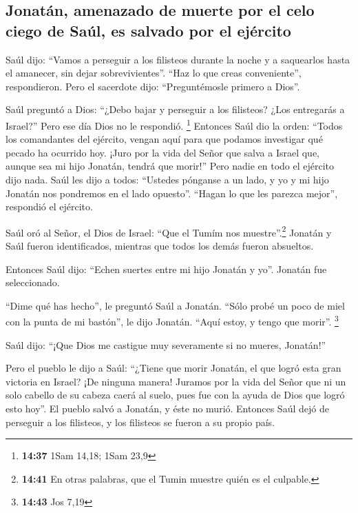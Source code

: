 \hypertarget{jonatuxe1n-amenazado-de-muerte-por-el-celo-ciego-de-sauxfal-es-salvado-por-el-ejuxe9rcito}{%
\subsection{Jonatán, amenazado de muerte por el celo ciego de Saúl, es
salvado por el
ejército}\label{jonatuxe1n-amenazado-de-muerte-por-el-celo-ciego-de-sauxfal-es-salvado-por-el-ejuxe9rcito}}

 Saúl dijo: ``Vamos a perseguir a los filisteos durante
la noche y a saquearlos hasta el amanecer, sin dejar sobrevivientes''.
``Haz lo que creas conveniente'', respondieron. Pero el sacerdote dijo:
``Preguntémosle primero a Dios''.

 Saúl preguntó a Dios: ``¿Debo bajar y perseguir a los
filisteos? ¿Los entregarás a Israel?'' Pero ese día Dios no le
respondió. \footnote{\textbf{14:37} 1Sam 14,18; 1Sam 23,9}
 Entonces Saúl dio la orden: ``Todos los comandantes del
ejército, vengan aquí para que podamos investigar qué pecado ha ocurrido
hoy.  ¡Juro por la vida del Señor que salva a Israel que,
aunque sea mi hijo Jonatán, tendrá que morir!'' Pero nadie en todo el
ejército dijo nada.  Saúl les dijo a todos: ``Ustedes
pónganse a un lado, y yo y mi hijo Jonatán nos pondremos en el lado
opuesto''. ``Hagan lo que les parezca mejor'', respondió el ejército.

 Saúl oró al Señor, el Dios de Israel: ``Que el Tumím nos
muestre''.\footnote{\textbf{14:41} En otras palabras, que el Tumin
  muestre quién es el culpable.} Jonatán y Saúl fueron identificados,
mientras que todos los demás fueron absueltos.

 Entonces Saúl dijo: ``Echen suertes entre mi hijo
Jonatán y yo''. Jonatán fue seleccionado.

 ``Dime qué has hecho'', le preguntó Saúl a Jonatán.
``Sólo probé un poco de miel con la punta de mi bastón'', le dijo
Jonatán. ``Aquí estoy, y tengo que morir''. \footnote{\textbf{14:43} Jos
  7,19}

 Saúl dijo: ``¡Que Dios me castigue muy severamente si no
mueres, Jonatán!''

 Pero el pueblo le dijo a Saúl: ``¿Tiene que morir
Jonatán, el que logró esta gran victoria en Israel? ¡De ninguna manera!
Juramos por la vida del Señor que ni un solo cabello de su cabeza caerá
al suelo, pues fue con la ayuda de Dios que logró esto hoy''. El pueblo
salvó a Jonatán, y éste no murió.  Entonces Saúl dejó de
perseguir a los filisteos, y los filisteos se fueron a su propio país.

